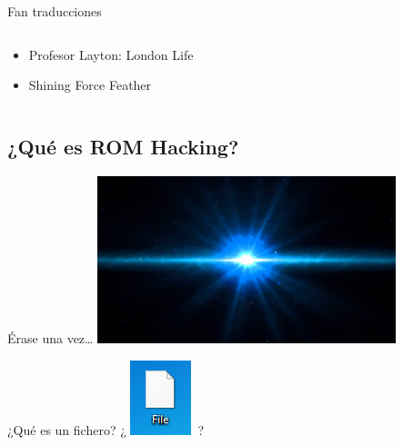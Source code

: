\begin{frame}{Fan traducciones}
\begin{columns}
\begin{column}{0.5\textwidth}
        \hfill
        \vfill
        \begin{itemize}
            \item<3-> Profesor Layton: London Life
            \item<4-> Shining Force Feather
        \end{itemize}
    \end{column}
    \end{columns}
\end{frame}

\subsection{¿Qué es ROM Hacking?}
\begin{frame}{Érase una vez\ldots}
    \centering \includegraphics[width=0.65\textwidth]{imgs/bigbang.jpg}
\end{frame}

\begin{frame}{¿Qué es un fichero?}
    \centering\fontsize{80}{0}\selectfont
    ¿ \includegraphics{imgs/file.png}~?
\end{frame}

